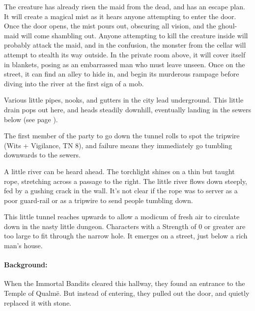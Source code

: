 \begin{multicols}{2}
The creature has already risen the maid from the dead, and has an escape plan.
It will create a magical mist as it hears anyone attempting to enter the door.
Once the door opens, the mist pours out, obscuring all vision, and the ghoul-maid will come shambling out.
Anyone attempting to kill the creature inside will probably attack the maid, and in the confusion, the monster from the cellar will attempt to stealth its way outside.
In the private room above, it will cover itself in blankets, posing as an embarrassed man who must leave unseen.
Once on the street, it can find an alley to hide in, and begin its murderous rampage before diving into the river at the first sign of a mob.



Various little pipes, nooks, and gutters in the city lead underground.
This little drain pops out here, and heads steadily downhill, eventually landing in the sewers below (see page \pageref{slidein}).

The first member of the party to go down the tunnel rolls to spot the tripwire (Wits + Vigilance, TN 8), and failure means they immediately go tumbling downwards to the sewers.

\begin{boxtext}

  A little river can be heard ahead.
  The torchlight shines on a thin but taught rope, stretching across a passage to the right.
  The little river flows down steeply, fed by a gushing crack in the wall.
  It's not clear if the rope was to server as a poor guard-rail or as a tripwire to send people tumbling down.

\end{boxtext}


This little tunnel reaches upwards to allow a modicum of fresh air to circulate down in the nasty little dungeon.  Characters with a Strength of 0 or greater are too large to fit through the narrow hole.  It emerges on a street, just below a rich man's house.


\paragraph{Background:}
When the Immortal Bandits cleared this hallway, they found an entrance to the Temple of Qualm\"e.
But instead of entering, they pulled out the door, and quietly replaced it with stone.


\end{multicols}
